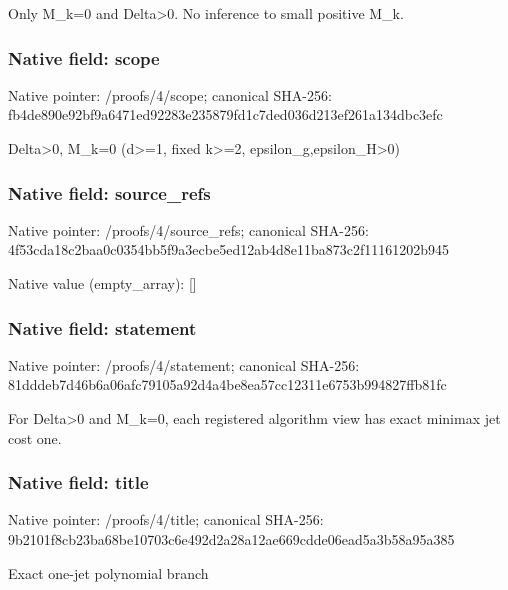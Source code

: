 \documentclass[10pt,a4paper]{article}
\begin{document}
\begingroup\raggedright\sloppy Only M\_\allowbreak{}k=\allowbreak{}0 and Delta>0. No inference to small positive M\_\allowbreak{}k.\par\endgroup

\subsubsection{Native field: scope}
Native pointer: /proofs/4/scope; canonical SHA-256: fb4de890e92bf9a6471ed92283e235879fd1c7ded036d213ef261a134dbc3efc

\begingroup\raggedright\sloppy Delta>0,\allowbreak{} M\_\allowbreak{}k=\allowbreak{}0 (d>=\allowbreak{}1,\allowbreak{} fixed k>=\allowbreak{}2,\allowbreak{} epsilon\_\allowbreak{}g,\allowbreak{}epsilon\_\allowbreak{}H>0)\par\endgroup

\subsubsection{Native field: source\_\allowbreak{}refs}
Native pointer: /proofs/4/source\_\allowbreak{}refs; canonical SHA-256: 4f53cda18c2baa0c0354bb5f9a3ecbe5ed12ab4d8e11ba873c2f11161202b945

Native value (empty\_\allowbreak{}array): []

\subsubsection{Native field: statement}
Native pointer: /proofs/4/statement; canonical SHA-256: 81dddeb7d46b6a06afc79105a92d4a4be8ea57cc12311e6753b994827ffb81fc

\begingroup\raggedright\sloppy For Delta>0 and M\_\allowbreak{}k=\allowbreak{}0,\allowbreak{} each registered algorithm view has exact minimax jet cost one.\par\endgroup

\subsubsection{Native field: title}
Native pointer: /proofs/4/title; canonical SHA-256: 9b2101f8cb23ba68be10703c6e492d2a28a12ae669cdde06ead5a3b58a95a385

\begingroup\raggedright\sloppy Exact one-jet polynomial branch\par\endgroup
\end{document}
